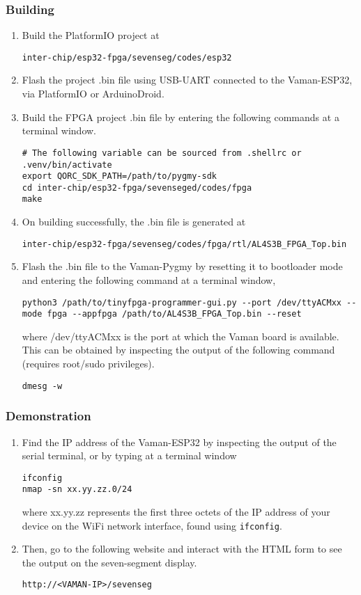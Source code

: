 \subsubsection{Building}
\begin{enumerate}
    \item Build the PlatformIO project at
    \begin{lstlisting}
inter-chip/esp32-fpga/sevenseg/codes/esp32
    \end{lstlisting}
    \item Flash the project .bin file using USB-UART connected to the 
    Vaman-ESP32, via PlatformIO or ArduinoDroid.
    \item Build the FPGA project .bin file by entering the following commands at
    a terminal window.
    \begin{lstlisting}
# The following variable can be sourced from .shellrc or .venv/bin/activate
export QORC_SDK_PATH=/path/to/pygmy-sdk
cd inter-chip/esp32-fpga/sevenseged/codes/fpga
make
    \end{lstlisting}
    \item On building successfully, the .bin file is generated at
    \begin{lstlisting}
inter-chip/esp32-fpga/sevenseg/codes/fpga/rtl/AL4S3B_FPGA_Top.bin
    \end{lstlisting}
    \item Flash the .bin file to the Vaman-Pygmy by resetting it to bootloader
    mode and entering the following command at a terminal window,
    \begin{lstlisting}
python3 /path/to/tinyfpga-programmer-gui.py --port /dev/ttyACMxx --mode fpga --appfpga /path/to/AL4S3B_FPGA_Top.bin --reset
    \end{lstlisting}
    where /dev/ttyACMxx is the port at which the Vaman board is available. This
    can be obtained by inspecting the output of the following command (requires
    root/sudo privileges).
    \begin{lstlisting}
dmesg -w
    \end{lstlisting}
\end{enumerate}

\subsubsection{Demonstration}
\begin{enumerate}
    \item Find the IP address of the Vaman-ESP32 by inspecting the output of the
    serial terminal, or by typing at a terminal window
    \begin{lstlisting}
ifconfig
nmap -sn xx.yy.zz.0/24
    \end{lstlisting}
    where xx.yy.zz represents the first three octets of the IP address of your
    device on the WiFi network interface, found using \texttt{ifconfig}.
    \item Then, go to the following website and interact with the HTML form to
    see the output on the seven-segment display.
    \begin{lstlisting}
http://<VAMAN-IP>/sevenseg
    \end{lstlisting}
\end{enumerate}

